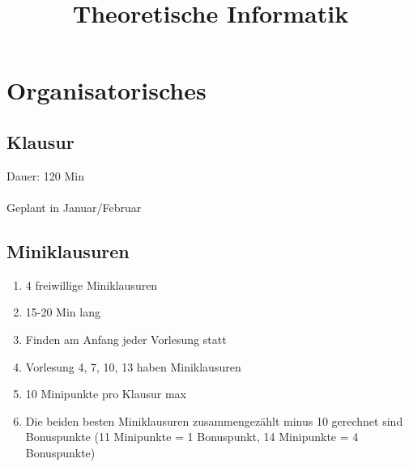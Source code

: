 \documentclass[11pt, a4paper]{article}
\begin{document}
\title{Theoretische Informatik}
\maketitle

\thispagestyle{empty}


\newpage

\tableofcontents

\newpage

\section{Organisatorisches}
\subsection{Klausur}
Dauer: 120 Min\\\\Geplant in Januar/Februar
\subsection{Miniklausuren}
\begin{enumerate}
\item 4 freiwillige Miniklausuren
\item 15-20 Min lang
\item Finden am Anfang jeder Vorlesung statt
\item Vorlesung 4, 7, 10, 13 haben Miniklausuren
\item 10 Minipunkte pro Klausur max
\item Die beiden besten Miniklausuren zusammengezählt minus 10 gerechnet sind Bonuspunkte (11 Minipunkte = 1 Bonuspunkt, 14 Minipunkte = 4 Bonuspunkte)
\end{enumerate}
\end{document}
